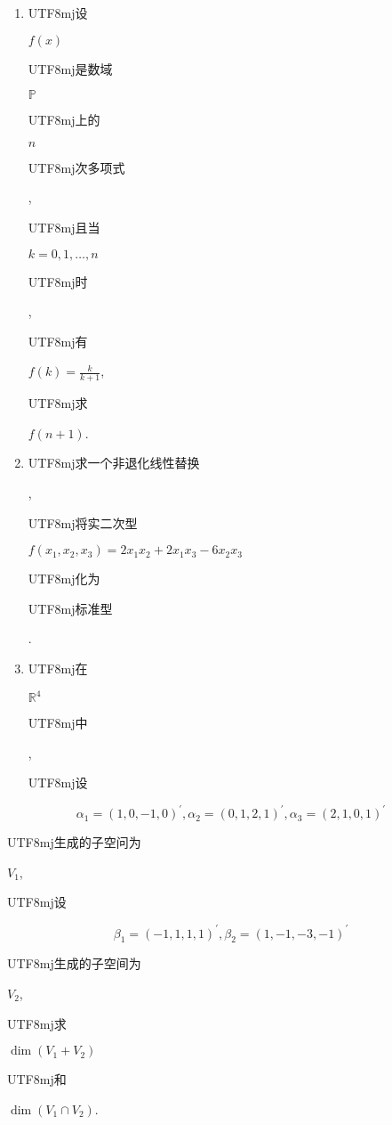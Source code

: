 \documentclass[10pt]{article}
\begin{document}
\begin{enumerate}
  \item \begin{CJK}{UTF8}{mj}设\end{CJK} $f(x)$ \begin{CJK}{UTF8}{mj}是数域\end{CJK} $\mathbb{P}$ \begin{CJK}{UTF8}{mj}上的\end{CJK} $n$ \begin{CJK}{UTF8}{mj}次多项式\end{CJK}, \begin{CJK}{UTF8}{mj}且当\end{CJK} $k=0,1, \ldots, n$ \begin{CJK}{UTF8}{mj}时\end{CJK}, \begin{CJK}{UTF8}{mj}有\end{CJK} $f(k)=\frac{k}{k+1}$, \begin{CJK}{UTF8}{mj}求\end{CJK} $f(n+1)$.

  \item \begin{CJK}{UTF8}{mj}求一个非退化线性替换\end{CJK}, \begin{CJK}{UTF8}{mj}将实二次型\end{CJK} $f\left(x_{1}, x_{2}, x_{3}\right)=2 x_{1} x_{2}+2 x_{1} x_{3}-6 x_{2} x_{3}$ \begin{CJK}{UTF8}{mj}化为\end{CJK} \begin{CJK}{UTF8}{mj}标准型\end{CJK}.

  \item \begin{CJK}{UTF8}{mj}在\end{CJK} $\mathbb{R}^{4}$ \begin{CJK}{UTF8}{mj}中\end{CJK}, \begin{CJK}{UTF8}{mj}设\end{CJK}

\end{enumerate}
$$
\alpha_{1}=(1,0,-1,0)^{\prime}, \alpha_{2}=(0,1,2,1)^{\prime}, \alpha_{3}=(2,1,0,1)^{\prime}
$$
\begin{CJK}{UTF8}{mj}生成的子空问为\end{CJK} $V_{1}$, \begin{CJK}{UTF8}{mj}设\end{CJK}
$$
\beta_{1}=(-1,1,1,1)^{\prime}, \beta_{2}=(1,-1,-3,-1)^{\prime}
$$
\begin{CJK}{UTF8}{mj}生成的子空间为\end{CJK} $V_{2}$, \begin{CJK}{UTF8}{mj}求\end{CJK} $\operatorname{dim}\left(V_{1}+V_{2}\right)$ \begin{CJK}{UTF8}{mj}和\end{CJK} $\operatorname{dim}\left(V_{1} \cap V_{2}\right)$.
\end{document}
